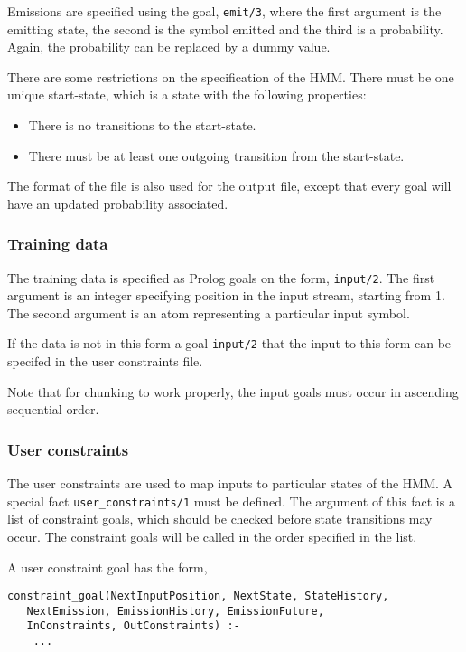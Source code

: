 \documentclass{article}
\begin{document}
Emissions are specified using the goal, \texttt{emit/3}, where the first argument is the emitting state, the second is the symbol emitted and the third is a probability. 
Again, the probability can be replaced by a dummy value.

There are some restrictions on the specification of the HMM. There must be one unique start-state, which is a state with the following properties:
\begin{itemize}
\item There is no transitions to the start-state.
\item There must be at least one outgoing transition from the start-state.
\end{itemize}

The format of the file is also used for the output file, except that every goal will have an updated probability associated.

\subsubsection{Training data}
\label{sec:training_data_file}

The training data is specified as Prolog goals on the form, \texttt{input/2}. The first argument is an integer specifying position in the input stream, starting from 1. The second 
argument is an atom representing a particular input symbol.

If the data is not in this form a goal \texttt{input/2} that the input to this form can be specifed in the user constraints file.

Note that for chunking to work properly, the input goals must occur in ascending sequential order.

\subsubsection{User constraints}
\label{sec:user_constraints}

The user constraints are used to map inputs to particular states of the HMM. A special fact \texttt{user\_constraints/1} must be defined.
The argument of this fact is a list of constraint goals, which should be checked before state transitions may occur. The constraint goals
will be called in the order specified in the list.

A user constraint goal has the form, 

\begin{verbatim}
constraint_goal(NextInputPosition, NextState, StateHistory,
   NextEmission, EmissionHistory, EmissionFuture,
   InConstraints, OutConstraints) :- 
    ... 
\end{verbatim}
\end{document}
